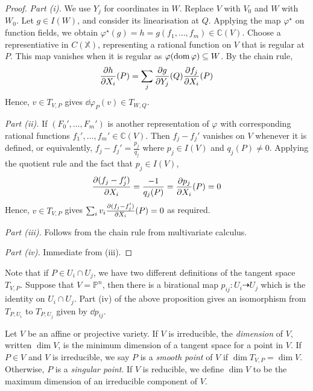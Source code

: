 \begin{proof}
    \emph{Part (i).}
    We use \( Y_j \) for coordinates in \( W \).
    Replace \( V \) with \( V_0 \) and \( W \) with \( W_0 \).
    Let \( g \in I(W) \), and consider its linearisation at \( Q \).
    Applying the map \( \varphi^\star \) on function fields, we obtain \( \varphi^\star(g) = h = g(f_1, \dots, f_m) \in \mathbb C(V) \).
    Choose a representiative in \( C(\mathbb X) \), representing a rational function on \( V \) that is regular at \( P \).
    This map vanishes when it is regular as \( \varphi(\operatorname{dom} \varphi) \subseteq W \).
    By the chain rule,
    \[ \pdv{h}{X_i}\qty(P) = \sum_j \pdv{g}{Y_j}\qty(Q) \pdv{f_j}{X_i}\qty(P) \]
    Hence, \( v \in T_{V,P} \) gives \( \dd{\varphi}_P(v) \in T_{W,Q} \).

    \emph{Part (ii).}
    If \( (F_0', \dots, F_m') \) is another representation of \( \varphi \) with corresponding rational functions \( f_1', \dots, f_m' \in \mathbb C(V) \).
    Then \( f_j - f_j' \) vanishes on \( V \) whenever it is defined, or equivalently, \( f_j - f_j' = \frac{p_j}{q_j} \) where \( p_j \in I(V) \) and \( q_j(P) \neq 0 \).
    Applying the quotient rule and the fact that \( p_j \in I(V) \),
    \[ \pdv{(f_j - f_j')}{X_i} = \frac{-1}{q_j(P)} = \pdv{p_j}{X_i}\qty(P) = 0 \]
    Hence, \( v \in T_{V,P} \) gives \( \sum_i v_i \pdv{(f_j - f_j')}{X_i}\qty(P) = 0 \) as required.

    \emph{Part (iii).}
    Follows from the chain rule from multivariate calculus.

    \emph{Part (iv).}
    Immediate from (iii).
\end{proof}
Note that if \( P \in U_i \cap U_j \), we have two different definitions of the tangent space \( T_{V,P} \).
Suppose that \( V = \mathbb P^n \), then there is a birational map \( p_{ij} \colon U_i \dashrightarrow U_j \) which is the identity on \( U_i \cap U_j \).
Part (iv) of the above proposition gives an isomorphism from \( T_{P,U_i} \) to \( T_{P,U_j} \) given by \( \dd{p}_{ij} \).
\begin{definition}
    Let \( V \) be an affine or projective variety.
    If \( V \) is irreducible, the \emph{dimension} of \( V \), written \( \dim V \), is the minimum dimension of a tangent space for a point in \( V \).
    If \( P \in V \) and \( V \) is irreducible, we say \( P \) is a \emph{smooth point} of \( V \) if \( \dim T_{V,P} = \dim V \).
    Otherwise, \( P \) is a \emph{singular point}.
    If \( V \) is reducible, we define \( \dim V \) to be the maximum dimension of an irreducible component of \( V \).
\end{definition}
